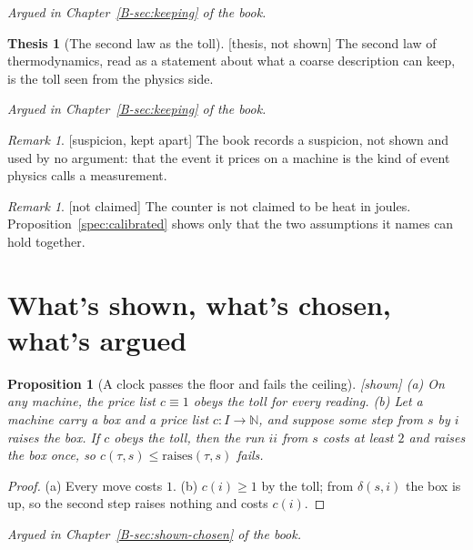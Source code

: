 \documentclass[11pt, a4paper]{article}
\theoremstyle{plain}
\newtheorem{proposition}[theorem]{Proposition}
\theoremstyle{definition}
\newtheorem{thesis}[theorem]{Thesis}
\theoremstyle{remark}
\newtheorem{remark}[theorem]{Remark}
\newcommand{\N}{\mathbb{N}}
\newcommand{\step}{\delta}
\newcommand{\cost}{c}
\newcommand{\argued}[1]{\par\noindent\textit{Argued in Chapter~\ref{B-#1} of the book.}\par}
\newcommand{\kind}[1]{\textup{[#1]}}
\begin{document}
\argued{sec:keeping}

\begin{thesis}[The second law as the toll]\label{spec:second-law} \kind{thesis, not shown}
The second law of thermodynamics, read as a statement about what a coarse description can keep, is the toll
seen from the physics side.
\end{thesis}

\argued{sec:keeping}

\begin{remark}\label{spec:measurement} \kind{suspicion, kept apart}
The book records a suspicion, not shown and used by no argument: that the event it prices on a machine is
the kind of event physics calls a measurement.
\end{remark}

\begin{remark}\label{spec:counter-not-heat} \kind{not claimed}
The counter is not claimed to be heat in joules. Proposition~\ref{spec:calibrated} shows only that the two
assumptions it names can hold together.
\end{remark}

\section{What's shown, what's chosen, what's argued}\label{spec:ch22}

\begin{proposition}[A clock passes the floor and fails the ceiling]\label{spec:clock} \kind{shown}
(a) On any machine, the price list $\cost\equiv1$ obeys the toll for every reading.
(b) Let a machine carry a box and a price list $\cost:I\to\N$, and suppose some step from $s$ by $i$ raises
the box. If $\cost$ obeys the toll, then the run $ii$ from $s$ costs at least $2$ and raises the box once, so
$\cost(\tau,s)\le\mathrm{raises}(\tau,s)$ fails.
\end{proposition}

\begin{proof}
(a) Every move costs $1$. (b) $\cost(i)\ge1$ by the toll; from $\step(s,i)$ the box is up, so the second step
raises nothing and costs $\cost(i)$.
\end{proof}

\argued{sec:shown-chosen}
\end{document}
